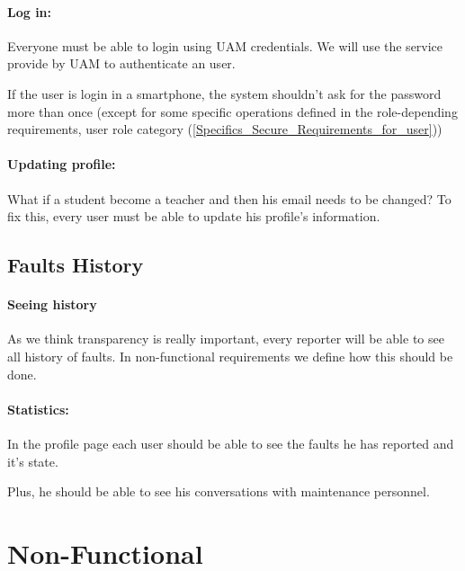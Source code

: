 \paragraph{Log in: } Everyone must be able to login using UAM credentials. We will use the service provide by UAM to authenticate an user.

If the user is login in a smartphone, the system shouldn't ask for the password more than once (except for some specific operations defined in the role-depending requirements, user role category (\ref{Specifics_Secure_Requirements_for_user}))

\paragraph{Updating profile: } What if a student become a teacher and then his email needs to be changed? To fix this, every user must be able to update his profile's information. 


\subsection{Faults History}

\paragraph{Seeing history} As we think transparency is really important, every reporter will be able to see all history of faults. In non-functional requirements we define how this should be done. 

\paragraph{Statistics: } In the profile page each user should be able to see the faults he has reported and it's state.

Plus, he should be able to see his conversations with maintenance personnel.


\section{Non-Functional}

